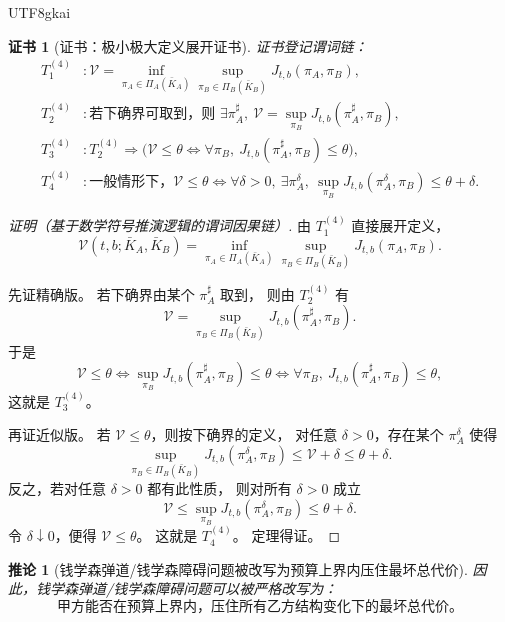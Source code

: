 \documentclass[12pt]{article}
\newtheorem{corollary}{推论}[section]
\newtheorem{Certificate}{证书}[section]
\begin{document}
\begin{CJK*}{UTF8}{gkai}
\begin{Certificate}[证书：极小极大定义展开证书]
\label{cert:tex1-ch4-semantics}
证书登记谓词链：
\[
\begin{aligned}
  T^{(4)}_1 &: \mathcal V=\inf_{\pi_A\in\Pi_A(\bar K_A)}\sup_{\pi_B\in\Pi_B(\bar K_B)}J_{t,b}(\pi_A,\pi_B),\\
  T^{(4)}_2 &: \text{若下确界可取到，则 } \exists \pi_A^\sharp,\
               \mathcal V=\sup_{\pi_B}J_{t,b}(\pi_A^\sharp,\pi_B),\\
  T^{(4)}_3 &: T^{(4)}_2\Rightarrow
               \bigl(\mathcal V\le \theta \Longleftrightarrow
               \forall \pi_B,\ J_{t,b}(\pi_A^\sharp,\pi_B)\le \theta\bigr),\\
  T^{(4)}_4 &: \text{一般情形下，}\mathcal V\le\theta
               \Longleftrightarrow
               \forall \delta>0,\ \exists \pi_A^\delta,\
               \sup_{\pi_B}J_{t,b}(\pi_A^\delta,\pi_B)\le \theta+\delta.
\end{aligned}
\]
\end{Certificate}

\begin{proof}[证明（基于数学符号推演逻辑的谓词因果链）]
由 \(T^{(4)}_1\) 直接展开定义，
\[
  \mathcal V(t,b;\bar K_A,\bar K_B)
  =
  \inf_{\pi_A\in\Pi_A(\bar K_A)}
  \sup_{\pi_B\in\Pi_B(\bar K_B)}
  J_{t,b}(\pi_A,\pi_B).
\]

先证精确版。
若下确界由某个 \(\pi_A^\sharp\) 取到，
则由 \(T^{(4)}_2\) 有
\[
  \mathcal V
  =
  \sup_{\pi_B\in\Pi_B(\bar K_B)}J_{t,b}(\pi_A^\sharp,\pi_B).
\]
于是
\[
  \mathcal V\le \theta
  \Longleftrightarrow
  \sup_{\pi_B}J_{t,b}(\pi_A^\sharp,\pi_B)\le \theta
  \Longleftrightarrow
  \forall \pi_B,\ J_{t,b}(\pi_A^\sharp,\pi_B)\le \theta,
\]
这就是 \(T^{(4)}_3\)。

再证近似版。
若 \(\mathcal V\le \theta\)，则按下确界的定义，
对任意 \(\delta>0\)，存在某个 \(\pi_A^\delta\) 使得
\[
  \sup_{\pi_B\in\Pi_B(\bar K_B)}J_{t,b}(\pi_A^\delta,\pi_B)
  \le
  \mathcal V+\delta
  \le
  \theta+\delta.
\]
反之，若对任意 \(\delta>0\) 都有此性质，
则对所有 \(\delta>0\) 成立
\[
  \mathcal V
  \le
  \sup_{\pi_B}J_{t,b}(\pi_A^\delta,\pi_B)
  \le
  \theta+\delta.
\]
令 \(\delta\downarrow 0\)，便得 \(\mathcal V\le \theta\)。
这就是 \(T^{(4)}_4\)。
定理得证。
\end{proof}

\begin{corollary}[钱学森弹道/钱学森障碍问题被改写为预算上界内压住最坏总代价]
\label{cor:tex1-ch4-semantics}
因此，钱学森弹道/钱学森障碍问题可以被严格改写为：
\[
  \text{甲方能否在预算上界内，压住所有乙方结构变化下的最坏总代价。}
\]
\end{corollary}


\end{CJK*}
\end{document}
